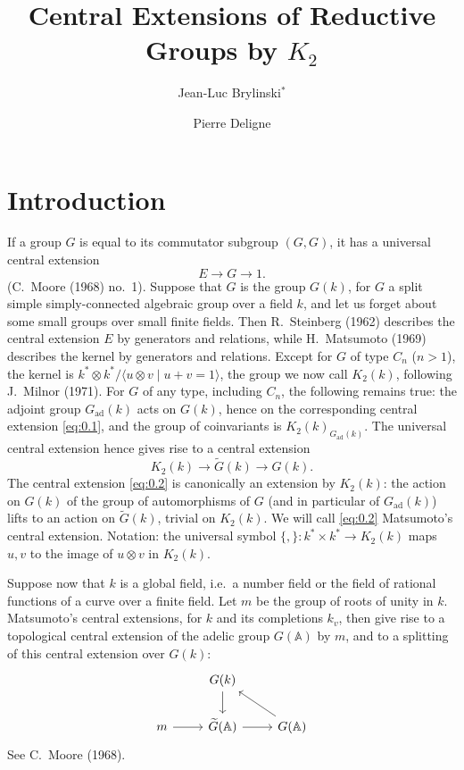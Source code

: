 \documentclass[11pt,a4paper]{article}
\theoremstyle{plain}
\theoremstyle{definition}
\newcommand{\bA}{\mathbb{A}}
\newcommand{\ad}{\mathrm{ad}}
\begin{document}
\title{Central Extensions of Reductive Groups by $K_2$}
\author{Jean-Luc Brylinski$^*$ \and Pierre Deligne}
\date{}
\maketitle
{}

\tableofcontents

\section{Introduction}

If a group $G$ is equal to its commutator subgroup $(G,G)$, it has a universal central extension
\begin{equation}\label{eq:0.1}
E \to G \to 1.
\end{equation}
(C.~Moore (1968) no.~1). Suppose that $G$ is the group $G(k)$, for $G$ a split simple simply-connected algebraic group over a field $k$, and let us forget about some small groups over small finite fields. Then R.~Steinberg (1962) describes the central extension $E$ by generators and relations, while H.~Matsumoto (1969) describes the kernel by generators and relations. Except for $G$ of type $C_n$ ($n>1$), the kernel is $k^* \otimes k^*/\langle u \otimes v \mid u+v=1 \rangle$, the group we now call $K_2(k)$, following J.~Milnor (1971). For $G$ of any type, including $C_n$, the following remains true: the adjoint group $G_{\ad}(k)$ acts on $G(k)$, hence on the corresponding central extension \eqref{eq:0.1}, and the group of coinvariants is $K_2(k)_{G_{\ad}(k)}$. The universal central extension hence gives rise to a central extension
\begin{equation}\label{eq:0.2}
K_2(k) \to \widetilde{G}(k) \to G(k).
\end{equation}
The central extension \eqref{eq:0.2} is canonically an extension by $K_2(k)$: the action on $G(k)$ of the group of automorphisms of $G$ (and in particular of $G_{\ad}(k)$) lifts to an action on $\widetilde{G}(k)$, trivial on $K_2(k)$. We will call \eqref{eq:0.2} Matsumoto's central extension. Notation: the universal symbol $\{,\}: k^* \times k^* \to K_2(k)$ maps $u,v$ to the image of $u \otimes v$ in $K_2(k)$.

Suppose now that $k$ is a global field, i.e.~a number field or the field of rational functions of a curve over a finite field. Let $m$ be the group of roots of unity in $k$. Matsumoto's central extensions, for $k$ and its completions $k_v$, then give rise to a topological central extension of the adelic group $G(\bA)$ by $m$, and to a splitting of this central extension over $G(k)$:
\begin{equation}\label{eq:0.3}
\begin{tikzcd}
& G(k) \arrow[d] \\
m \arrow[r] & \widetilde{G}(\bA) \arrow[r] & G(\bA) \arrow[lu]
\end{tikzcd}
\end{equation}
See C.~Moore (1968).
\end{document}
